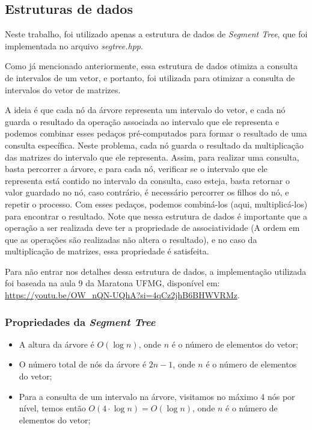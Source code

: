 \documentclass{article}
\begin{document}
\subsection{Estruturas de dados}

Neste trabalho, foi utilizado apenas a estrutura de dados de \emph{Segment Tree}, que foi implementada no arquivo \emph{segtree.hpp}.

Como já mencionado anteriormente, essa estrutura de dados otimiza a consulta de intervalos de um vetor, e portanto, foi utilizada para otimizar a consulta de intervalos do vetor de matrizes.

A ideia é que cada nó da árvore representa um intervalo do vetor, e cada nó guarda o resultado da operação associada ao intervalo que ele representa e podemos combinar esses pedaços pré-computados para formar o resultado de uma consulta específica. Neste problema, cada nó guarda o resultado da multiplicação das matrizes do intervalo que ele representa. Assim, para realizar uma consulta, basta percorrer a árvore, e para cada nó, 
verificar se o intervalo que ele representa está contido no intervalo da consulta, caso esteja, basta retornar o valor guardado no nó, caso contrário, é necessário percorrer os filhos do nó, e repetir o processo.
Com esses pedaços, podemos combiná-los (aqui, multiplicá-los) para encontrar o resultado. Note que nessa estrutura de dados é importante que a operação a ser realizada deve ter a propriedade de associatividade (A ordem em que as operações são realizadas não altera o resultado), e no caso da multiplicação de matrizes, essa propriedade é satisfeita.

Para não entrar nos detalhes dessa estrutura de dados, a implementação utilizada foi baseada na aula 9 da Maratona UFMG, disponível em: \url{https://youtu.be/OW_nQN-UQhA?si=4qCz2jhB6BHWVRMz}. 

\subsubsection*{Propriedades da \emph{Segment Tree}} \label{sec:prop_segtree}
\begin{itemize}
    \item A altura da árvore é $O(\log n)$, onde $n$ é o número de elementos do vetor;
    \item O número total de nós da árvore é $2n -1$, onde $n$ é o número de elementos do vetor;
    \item Para a consulta de um intervalo na árvore, visitamos no máximo 4 nós por nível, temos então $O(4 \cdot \log n) = O(\log n)$, onde $n$ é o número de elementos do vetor;
\end{itemize}
\end{document}
